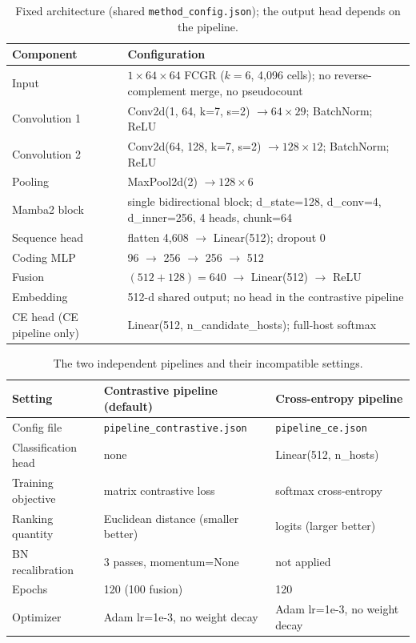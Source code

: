 \documentclass[utf8]{frontiers_suppmat}
\begin{document}
\begin{table}[ht]
\centering
\renewcommand{\arraystretch}{1.25}
\caption{Fixed architecture (shared \texttt{method\_config.json}); the output head depends on the pipeline.}\label{tab:S1}
\footnotesize
\begin{tabular}{p{3.1cm} p{11.6cm}}
\hline
Component & Configuration \\
\hline
Input & $1\times64\times64$ FCGR ($k=6$, 4,096 cells); no reverse-complement merge, no pseudocount \\
Convolution 1 & Conv2d(1, 64, k=7, s=2) $\rightarrow 64\times29$; BatchNorm; ReLU \\
Convolution 2 & Conv2d(64, 128, k=7, s=2) $\rightarrow 128\times12$; BatchNorm; ReLU \\
Pooling & MaxPool2d(2) $\rightarrow 128\times6$ \\
Mamba2 block & single bidirectional block; d\_state=128, d\_conv=4, d\_inner=256, 4 heads, chunk=64 \\
Sequence head & flatten 4,608 $\rightarrow$ Linear(512); dropout 0 \\
Coding MLP & 96 $\rightarrow$ 256 $\rightarrow$ 256 $\rightarrow$ 512 \\
Fusion & $(512+128)=640$ $\rightarrow$ Linear(512) $\rightarrow$ ReLU \\
Embedding & 512-d shared output; no head in the contrastive pipeline \\
CE head (CE pipeline only) & Linear(512, n\_candidate\_hosts); full-host softmax \\
\hline
\end{tabular}
\end{table}

\begin{table}[ht]
\centering
\renewcommand{\arraystretch}{1.25}
\caption{The two independent pipelines and their incompatible settings.}\label{tab:S2}
\footnotesize
\begin{tabular}{p{3.3cm} p{5.6cm} p{5.6cm}}
\hline
Setting & Contrastive pipeline (default) & Cross-entropy pipeline \\
\hline
Config file & \texttt{pipeline\_contrastive.json} & \texttt{pipeline\_ce.json} \\
Classification head & none & Linear(512, n\_hosts) \\
Training objective & matrix contrastive loss & softmax cross-entropy \\
Ranking quantity & Euclidean distance (smaller better) & logits (larger better) \\
BN recalibration & 3 passes, momentum=None & not applied \\
Epochs & 120 (100 fusion) & 120 \\
Optimizer & Adam lr=1e-3, no weight decay & Adam lr=1e-3, no weight decay \\
\hline
\end{tabular}
\end{table}
\end{document}
